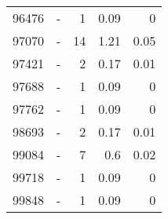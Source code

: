 \begin{longtable}{lXrrr}
        96476 & \multicolumn{1}{X}{-} & %
          \num{1} &
          \num[round-mode=places,round-precision=2]{0,09} &
          \num[round-mode=places,round-precision=2]{0} \\

        97070 & \multicolumn{1}{X}{-} & %
          \num{14} &
          \num[round-mode=places,round-precision=2]{1,21} &
          \num[round-mode=places,round-precision=2]{0,05} \\

        97421 & \multicolumn{1}{X}{-} & %
          \num{2} &
          \num[round-mode=places,round-precision=2]{0,17} &
          \num[round-mode=places,round-precision=2]{0,01} \\

        97688 & \multicolumn{1}{X}{-} & %
          \num{1} &
          \num[round-mode=places,round-precision=2]{0,09} &
          \num[round-mode=places,round-precision=2]{0} \\

        97762 & \multicolumn{1}{X}{-} & %
          \num{1} &
          \num[round-mode=places,round-precision=2]{0,09} &
          \num[round-mode=places,round-precision=2]{0} \\

        98693 & \multicolumn{1}{X}{-} & %
          \num{2} &
          \num[round-mode=places,round-precision=2]{0,17} &
          \num[round-mode=places,round-precision=2]{0,01} \\

        99084 & \multicolumn{1}{X}{-} & %
          \num{7} &
          \num[round-mode=places,round-precision=2]{0,6} &
          \num[round-mode=places,round-precision=2]{0,02} \\

        99718 & \multicolumn{1}{X}{-} & %
          \num{1} &
          \num[round-mode=places,round-precision=2]{0,09} &
          \num[round-mode=places,round-precision=2]{0} \\

        99848 & \multicolumn{1}{X}{-} & %
          \num{1} &
          \num[round-mode=places,round-precision=2]{0,09} &
          \num[round-mode=places,round-precision=2]{0} \\


\end{longtable}
